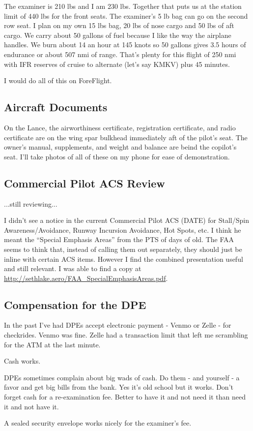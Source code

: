 The examiner is 210 lbs and I am 230 lbs. Together that puts us at the station limit of 440 lbs for the front seats. The examiner's 5 lb bag can go on the second row seat. I plan on my own 15 lbs bag, 20 lbs of nose cargo and 50 lbs of aft cargo. We carry about 50 gallons of fuel because I like the way the airplane handles. We burn about 14 an hour at 145 knots so 50 gallons gives 3.5 hours of endurance or about 507 nmi of range. That's plenty for this flight of 250 nmi with IFR reserves of cruise to alternate (let's say KMKV) plus 45 minutes.

I would do all of this on ForeFlight.

\subsection{Aircraft Documents}

On the Lance, the airworthiness certificate, registration certificate, and radio certificate are on the wing spar bulkhead immediately aft of the pilot's seat. The owner's manual, supplements, and weight and balance are beind the copilot's seat. I'll take photos of all of these on my phone for ease of demonstration.

\subsection{Commercial Pilot ACS Review}

...still reviewing...

I didn't see a notice in the current Commercial Pilot ACS (DATE) for Stall/Spin Awareness/Avoidance, Runway Incursion Avoidance, Hot Spots, etc. I think he meant the ``Special Emphasis Areas'' from the PTS of days of old. The FAA seems to think that, instead of calling them out separately, they should just be inline with certain ACS items. However I find the combined presentation useful and still relevant. I was able to find a copy at \url{http://sethlake.aero/FAA_SpecialEmphasisAreas.pdf}.

\subsection{Compensation for the DPE}

In the past I've had DPEs accept electronic payment - Venmo or Zelle - for checkrides. Venmo was fine. Zelle had a transaction limit that left me scrambling for the ATM at the last minute.

Cash works.

DPEs sometimes complain about big wads of cash. Do them - and yourself - a favor and get big bills from the bank. Yes it's old school but it works. Don't forget cash for a re-examination fee. Better to have it and not need it than need it and not have it.

A sealed security envelope works nicely for the examiner's fee.



